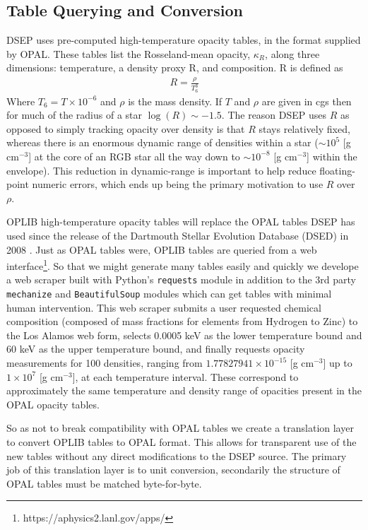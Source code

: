 \subsection{Table Querying and Conversion}
DSEP uses pre-computed high-temperature opacity tables, in the format supplied
by OPAL. These tables list the Rosseland-mean opacity, $\kappa_{R}$, along
three dimensions: temperature, a density proxy R, and composition. R is defined
as
\begin{align} \label{eqn:Req}
	R = \frac{\rho}{T_{6}^{3}}
\end{align}
Where $T_{6} = T\times10^{-6}$ and $\rho$ is the mass density. If $T$ and
$\rho$ are given in cgs then for much of the radius of a star
$\log(R)\sim-1.5$.  The reason DSEP uses $R$ as opposed to simply tracking
opacity over density is that $R$ stays relatively fixed, whereas there is an
enormous dynamic range of densities within a star ($\sim 10^{5}$ [g cm$^{-3}$]
at the core of an RGB star all the way down to $\sim 10^{-8}$ [g
cm$^{-3}$] within the envelope). This reduction in
dynamic-range is important to help reduce floating-point numeric errors, which
ends up being the primary motivation to use $R$ over $\rho$.

OPLIB high-temperature opacity tables will replace the OPAL tables DSEP has used
since the release of the Dartmouth Stellar Evolution Database (DSED) in 2008
\citep{Dotter2008}. Just as OPAL tables were, OPLIB tables are queried from a
web interface\footnote{https://aphysics2.lanl.gov/apps/}. So that we might
generate many tables easily and quickly we develope a web scraper built with
Python's \texttt{requests} module in addition to the 3rd party
\texttt{mechanize} and \texttt{BeautifulSoup} modules \citep{chandra2015python,
richardson2007beautiful} which can get tables with minimal human intervention.
This web scraper submits a user requested chemical composition (composed of
mass fractions for elements from Hydrogen to Zinc) to the Los Alamos web form, selects
0.0005 keV as the lower temperature bound and 60 keV as the upper temperature
bound, and finally requests opacity measurements for 100 densities, ranging
from $1.77827941\times 10 ^{-15}$ [g cm$^{-3}$] up to $1\times10^{7}$ [g
cm$^{-3}$], at each temperature interval. These correspond to approximately the
same temperature and density range of opacities present in the OPAL opacity
tables.

So as not to break compatibility with OPAL tables we create a translation layer
to convert OPLIB tables to OPAL format. This allows for transparent use of the new
tables without any direct modifications to the DSEP source. The primary job of
this translation layer is to unit conversion, secondarily the structure of OPAL
tables must be matched byte-for-byte.


